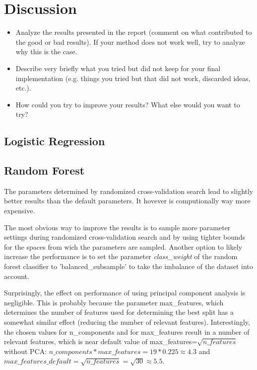 \documentclass[a4, 10 pt, conference]{ieeeconf}  %
\begin{document}
\section{Discussion}
\label{sec:discuss}

{\color{blue}
\begin{itemize}
	\item Analyze the results presented in the report (comment on what contributed to the good or bad results). If your method does not work well, try to analyze why this is the case.
	\item Describe very briefly what you tried but did not keep for your final implementation (e.g. things you tried but that did not work, discarded ideas, etc.).
	\item How could you try to improve your results? What else would you want to try?

\end{itemize}
}
\subsection{Logistic Regression}
\subsection{Random Forest}
The parameters determined by randomized cross-validation search lead to slightly better results than the default parameters. It hovever is computionally way more expensive.

The most obvious way to improve the results is to sample more parameter settings during randomized cross-validation search and by using tighter bounds for the spaces from wich the parameters are sampled. Another option to likely increase the performance is to set the parameter \emph{class\_weight} of the random forest classifier to 'balanced\_subsample' to take the imbalance of the dataset into account.

Surprisingly, the effect on performance of using principal component analysis is negligible. This is probably because the parameter max\_features, which determines the number of features used for determining the best split has a somewhat similar effect (reducing the number of relevant features). Interestingly, the chosen values for n\_components and for max\_features result in a number of relevant features, which is near default value of max\_features=$\sqrt{n\_features}$ \cite{sl.rf} without PCA: $n\_components*max\_features = 19*0.225 \approx 4.3$ and $max\_features\_default=\sqrt{n\_features}=\sqrt{30}\approx 5.5$.
\end{document}
